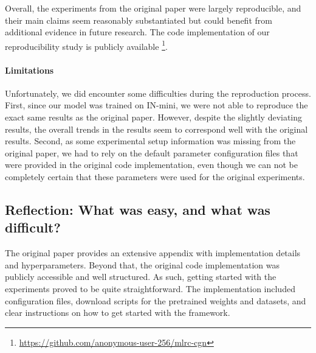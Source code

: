 Overall, the experiments from the original paper were largely reproducible, and their main claims seem reasonably substantiated but could benefit from additional evidence in future research. The code implementation of our reproducibility study is publicly available \footnote{\url{https://github.com/anonymous-user-256/mlrc-cgn}}. 

\paragraph{Limitations}
Unfortunately, we did encounter some difficulties during the reproduction process. First, since our model was trained on IN-mini, we were not able to reproduce the exact same results as the original paper. However, despite the slightly deviating results, the overall trends in the results seem to correspond well with the original results. Second, as some experimental setup information was missing from the original paper, we had to rely on the default parameter configuration files that were provided in the original code implementation, even though we can not be completely certain that these parameters were used for the original experiments. 


\subsection{Reflection: What was easy, and what was difficult?}


The original paper provides an extensive appendix with implementation details and hyperparameters. Beyond that, the original code implementation was publicly accessible and well structured. As such, getting started with the experiments proved to be quite straightforward. The implementation included configuration files, download scripts for the pretrained weights and datasets, and clear instructions on how to get started with the framework.

